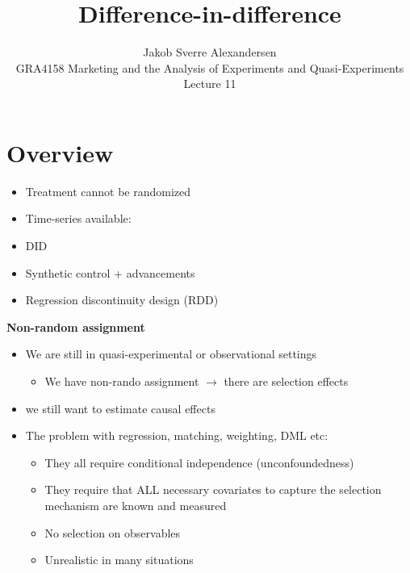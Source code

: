 \documentclass[10pt]{article}
\begin{document}
 
\title{Difference-in-difference}
\author{Jakob Sverre Alexandersen\\
GRA4158 Marketing and the Analysis of Experiments and Quasi-Experiments\\
Lecture 11}
\maketitle

\tableofcontents
\newpage
\section{Overview}
\begin{itemize}
    \item Treatment cannot be randomized 
    \item Time-series available:
    \item DID 
    \item Synthetic control + advancements 
    \item Regression discontinuity design (RDD)
\end{itemize}
\textbf{Non-random assignment}
\begin{itemize}
    \item We are still in quasi-experimental or observational settings 
    \begin{itemize}
        \item We have non-rando assignment $\to $ there are selection effects 
    \end{itemize}
    \item we still want to estimate causal effects 
    \item The problem with regression, matching, weighting, DML etc: 
    \begin{itemize}
        \item They all require conditional independence (unconfoundedness)
        \item They require that ALL necessary covariates to capture the selection mechanism are known and measured 
        \item No selection on observables 
        \item Unrealistic in many situations 
    \end{itemize}
\end{itemize}
\end{document}
